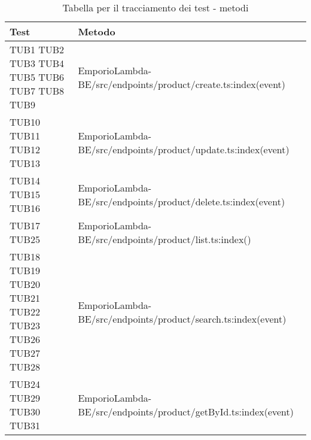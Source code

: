 {

\centering
\renewcommand{\arraystretch}{2}
\begin{longtable}{C{2cm} C{12.8cm}}
\caption{Tabella per il tracciamento dei test - metodi}\\
\textbf{Test} &
\textbf{Metodo}\\
\endhead


TUB1 \newline TUB2 \newline TUB3 \newline TUB4 \newline TUB5 \newline TUB6 \newline TUB7 \newline TUB8 \newline TUB9 & EmporioLambda-BE/src/endpoints/product/create.ts:index(event)\\

TUB10 \newline TUB11 \newline TUB12 \newline TUB13 & EmporioLambda-BE/src/endpoints/product/update.ts:index(event)\\

TUB14 \newline TUB15 \newline TUB16 & EmporioLambda-BE/src/endpoints/product/delete.ts:index(event)\\

TUB17 \newline TUB25 & EmporioLambda-BE/src/endpoints/product/list.ts:index()\\

TUB18 \newline TUB19 \newline TUB20 \newline TUB21 \newline TUB22 \newline TUB23 \newline TUB26 \newline TUB27 \newline TUB28 & EmporioLambda-BE/src/endpoints/product/search.ts:index(event)\\

TUB24 \newline TUB29 \newline TUB30 \newline TUB31 & EmporioLambda-BE/src/endpoints/product/getById.ts:index(event)\\


\end{longtable}}
